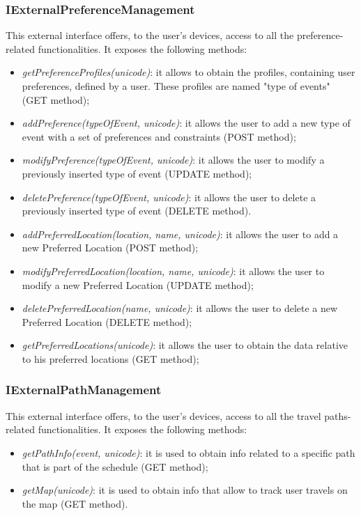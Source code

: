 \subsubsection{IExternalPreferenceManagement}
This external interface offers, to the user's devices, access to all the preference-related functionalities. It exposes the following methods:
\begin{itemize}
\item \textit{getPreferenceProfiles(unicode)}: it allows to obtain the profiles, containing user preferences, defined by a user. These profiles are named "type of events" (GET method);
\item \textit{addPreference(typeOfEvent, unicode)}: it allows the user to add a new type of event with a set of preferences and constraints (POST method);
\item \textit{modifyPreference(typeOfEvent, unicode)}: it allows the user to modify a previously inserted type of event (UPDATE method);
\item \textit{deletePreference(typeOfEvent, unicode)}: it allows the user to delete a previously inserted type of event (DELETE method).
\item \textit{addPreferredLocation(location, name, unicode)}: it allows the user to add a new Preferred Location (POST method);
\item \textit{modifyPreferredLocation(location, name, unicode)}: it allows the user to modify a new Preferred Location (UPDATE method);
\item \textit{deletePreferredLocation(name, unicode)}: it allows the user to delete a new Preferred Location (DELETE method);
\item \textit{getPreferredLocations(unicode)}: it allows the user to obtain the data relative to his preferred locations (GET method);
\end{itemize}
\subsubsection{IExternalPathManagement}
This external interface offers, to the user's devices, access to all the travel paths-related functionalities. It exposes the following methods:
\begin{itemize}
\item \textit{getPathInfo(event, unicode)}: it is used to obtain info related to a specific path that is part of the schedule (GET method);
\item \textit{getMap(unicode)}: it is used to obtain info that allow to track user travels on the map (GET method).
\end{itemize}

